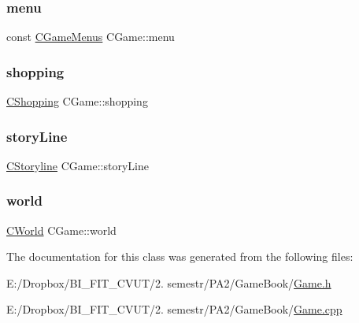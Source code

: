 \subsubsection{\texorpdfstring{menu}{menu}}
{\footnotesize\ttfamily const \mbox{\hyperlink{class_c_game_menus}{C\+Game\+Menus}} C\+Game\+::menu\hspace{0.3cm}{\ttfamily [protected]}}

\mbox{\label{class_c_game_a0fdb3b2f7ef2565b0d52fdb987491f90}} 
\subsubsection{\texorpdfstring{shopping}{shopping}}
{\footnotesize\ttfamily \mbox{\hyperlink{class_c_shopping}{C\+Shopping}} C\+Game\+::shopping\hspace{0.3cm}{\ttfamily [protected]}}

\mbox{\label{class_c_game_af02e0478a8e6902d8f14402c217df461}} 
\subsubsection{\texorpdfstring{story\+Line}{storyLine}}
{\footnotesize\ttfamily \mbox{\hyperlink{class_c_storyline}{C\+Storyline}} C\+Game\+::story\+Line\hspace{0.3cm}{\ttfamily [protected]}}

\mbox{\label{class_c_game_a034dfd3cfdbc751db8c8dca996b95b2f}} 
\subsubsection{\texorpdfstring{world}{world}}
{\footnotesize\ttfamily \mbox{\hyperlink{class_c_world}{C\+World}} C\+Game\+::world\hspace{0.3cm}{\ttfamily [protected]}}



The documentation for this class was generated from the following files\+:\begin{DoxyCompactItemize}
\item 
E\+:/\+Dropbox/\+B\+I\+\_\+\+F\+I\+T\+\_\+\+C\+V\+U\+T/2. semestr/\+P\+A2/\+Game\+Book/\mbox{\hyperlink{_game_8h}{Game.\+h}}\item 
E\+:/\+Dropbox/\+B\+I\+\_\+\+F\+I\+T\+\_\+\+C\+V\+U\+T/2. semestr/\+P\+A2/\+Game\+Book/\mbox{\hyperlink{_game_8cpp}{Game.\+cpp}}\end{DoxyCompactItemize}
